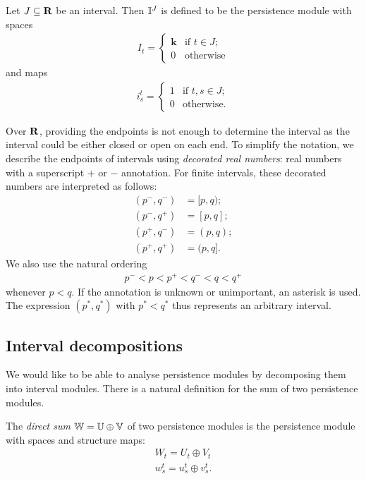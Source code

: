 \begin{definition}
Let $J \subseteq \mathbf{R}$ be an interval. Then $\mathbb{I}^J$ is defined to be the persistence module with spaces
\begin{align*}
I_t = \begin{cases}
\mathbf{k} & \text{if } t \in J; \\
0 & \text{otherwise}
\end{cases}
\end{align*}
and maps
\begin{align*}
i_s^t = \begin{cases}
1 & \text{if } t, s \in J; \\
0 & \text{otherwise.}
\end{cases}
\end{align*}
\end{definition}

Over $\mathbf{R}$, providing the endpoints is not enough to determine the interval as the interval could be either closed or open on each end. To simplify the notation, we describe the endpoints of intervals using \emph{decorated real numbers}: real numbers with a superscript $+$ or $-$ annotation. For finite intervals, these decorated numbers are interpreted as follows:
\begin{align*}
(p^-, q^-) &= [p, q); \\
(p^-, q^+) &= [p, q]; \\
(p^+, q^-) &= (p, q); \\
(p^+, q^+) &= (p, q]. 
\end{align*}
We also use the natural ordering
\begin{align*}
p^- < p < p^+ < q^- < q < q^+
\end{align*}
whenever $p < q$. If the annotation is unknown or unimportant, an asterisk is used. The expression $(p^*, q^*)$ with $p^* < q^*$ thus represents an arbitrary interval. 

\subsection{Interval decompositions}

We would like to be able to analyse persistence modules by decomposing them into interval modules. There is a natural definition for the sum of two persistence modules.

\begin{definition}
The \emph{direct sum} $\mathbb{W} = \mathbb{U} \oplus \mathbb{V}$ of two persistence modules is the persistence module with spaces and structure maps:
\begin{align*}
W_t = U_t \oplus V_t \\
w_s^t = u_s^t \oplus v_s^t.
\end{align*}
\end{definition}


